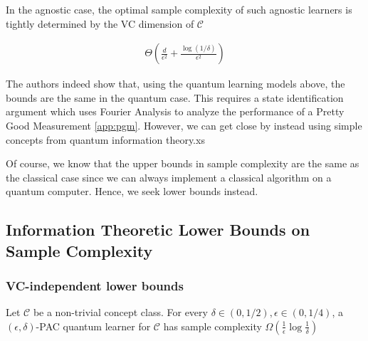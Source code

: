 \documentclass[main.tex]{subfiles}
\begin{document}
In the agnostic case, the optimal sample complexity of such agnostic learners is tightly determined by the VC dimension of $\mathcal{C}$

\begin{align*}
\Theta(\frac{d}{\epsilon^2} + \frac{\log(1/\delta)}{\epsilon^2})
\end{align*}

The authors indeed show that, using the quantum learning models above, the bounds are the same in the quantum case. This requires a state identification argument which uses Fourier Analysis to analyze the performance of a Pretty Good Measurement \ref{app:pgm}. However, we can get close by instead using simple concepts from quantum information theory.xs

Of course, we know that the upper bounds in sample complexity are the same as the classical case since we can always implement a classical algorithm on a quantum computer. Hence, we seek lower bounds instead. 

\subsection{Information Theoretic Lower Bounds on Sample Complexity}

\subsubsection{VC-independent lower bounds}

\begin{lemma}
\label{lem:vc-indep-pac}
Let $\mathcal{C}$ be a non-trivial concept class. For every $\delta \in (0,1/2), \epsilon \in (0,1/4)$, a $(\epsilon,\delta)$-PAC quantum learner for $\mathcal{C}$ has sample complexity $\Omega(\frac{1}{\epsilon}\log \frac{1}{\delta})$
\end{lemma}
\end{document}

